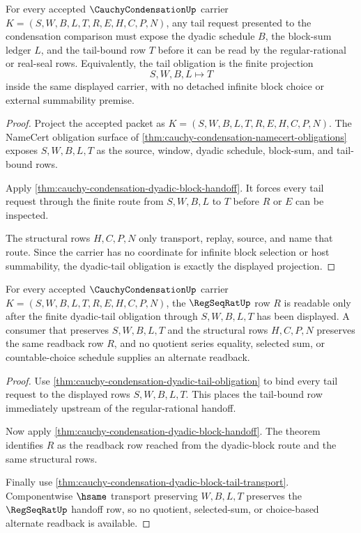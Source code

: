 \begin{theorem}
\label{thm:cauchy-condensation-dyadic-tail-obligation}
For every accepted $\CauchyCondensationUp$ carrier $K=(S,W,B,L,T,R,E,H,C,P,N)$, any tail request presented to the condensation comparison must expose the dyadic schedule $B$, the block-sum ledger $L$, and the tail-bound row $T$ before it can be read by the regular-rational or real-seal rows. Equivalently, the tail obligation is the finite projection
$$
S,W,B,L \longmapsto T
$$
inside the same displayed carrier, with no detached infinite block choice or external summability premise.
\end{theorem}
\begin{proof}
Project the accepted packet as $K=(S,W,B,L,T,R,E,H,C,P,N)$. The NameCert obligation surface of \autoref{thm:cauchy-condensation-namecert-obligations} exposes $S,W,B,L,T$ as the source, window, dyadic schedule, block-sum, and tail-bound rows.

Apply \autoref{thm:cauchy-condensation-dyadic-block-handoff}. It forces every tail request through the finite route from $S,W,B,L$ to $T$ before $R$ or $E$ can be inspected.

The structural rows $H,C,P,N$ only transport, replay, source, and name that route. Since the carrier has no coordinate for infinite block selection or host summability, the dyadic-tail obligation is exactly the displayed projection.
\end{proof}

\begin{theorem}
\label{thm:cauchy-condensation-regseqrat-readback-obligation}
For every accepted $\CauchyCondensationUp$ carrier $K=(S,W,B,L,T,R,E,H,C,P,N)$, the $\RegSeqRatUp$ row $R$ is readable only after the finite dyadic-tail obligation through $S,W,B,L,T$ has been displayed. A consumer that preserves $S,W,B,L,T$ and the structural rows $H,C,P,N$ preserves the same readback row $R$, and no quotient series equality, selected sum, or countable-choice schedule supplies an alternate readback.
\end{theorem}
\begin{proof}
Use \autoref{thm:cauchy-condensation-dyadic-tail-obligation} to bind every tail request to the displayed rows $S,W,B,L,T$. This places the tail-bound row immediately upstream of the regular-rational handoff.

Now apply \autoref{thm:cauchy-condensation-dyadic-block-handoff}. The theorem identifies $R$ as the readback row reached from the dyadic-block route and the same structural rows.

Finally use \autoref{thm:cauchy-condensation-dyadic-block-tail-transport}. Componentwise $\hsame$ transport preserving $W,B,L,T$ preserves the $\RegSeqRatUp$ handoff row, so no quotient, selected-sum, or choice-based alternate readback is available.
\end{proof}


